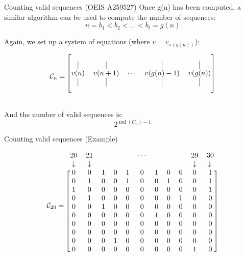 \documentclass{beamer}
\begin{document}
\begin{frame}{Counting valid sequences (OEIS A259527)}
  Once g(n) has been computed, a similar algorithm can be used to compute the
  number of sequences: \[
    n = b_1 < b_2 < \hdots < b_t = g(n)
  \]

  Again, we set up a system of equations (where $v = v_{\pi(g(n))}$): \[
    \mathcal{C}_n =
    \begin{blockarray}{ccccc}
      \begin{block}{[ccccc]}
        & & & & \\
        \vrule & \vrule   &        & \vrule      & \vrule \\
        v(n)   & v(n + 1) & \cdots & v(g(n) - 1) & v(g(n)) \\
        \vrule & \vrule   &        & \vrule      & \vrule \\
        & & & & \\
      \end{block}
    \end{blockarray}
  \]

    And the number of valid sequences is: \[ 2^{\operatorname{nul}(C_n) - 1} \]
\end{frame}

\begin{frame}{Counting valid sequences (Example)}

    \[
      \mathcal{C}_{20} =
      \begin{blockarray}{ccccccccccc}
    20         & 21         & & & & \cdots & & & & 29         & 30         \\
    \downarrow & \downarrow & & & &        & & & & \downarrow & \downarrow \\
      \begin{block}{[ccccccccccc]}
        0 & 0 & 1 & 0 & 1 & 0 & 1 & 0 & 0 & 0 & 1 \\
        0 & 1 & 0 & 0 & 1 & 0 & 0 & 1 & 0 & 0 & 1 \\
        1 & 0 & 0 & 0 & 0 & 0 & 0 & 0 & 0 & 0 & 1 \\
        0 & 1 & 0 & 0 & 0 & 0 & 0 & 0 & 1 & 0 & 0 \\
        0 & 0 & 1 & 0 & 0 & 0 & 0 & 0 & 0 & 0 & 0 \\
        0 & 0 & 0 & 0 & 0 & 0 & 1 & 0 & 0 & 0 & 0 \\
        0 & 0 & 0 & 0 & 0 & 0 & 0 & 0 & 0 & 0 & 0 \\
        0 & 0 & 0 & 0 & 0 & 0 & 0 & 0 & 0 & 0 & 0 \\
        0 & 0 & 0 & 1 & 0 & 0 & 0 & 0 & 0 & 0 & 0 \\
        0 & 0 & 0 & 0 & 0 & 0 & 0 & 0 & 0 & 1 & 0 \\
      \end{block}
      \end{blockarray}
    \]

\end{frame}
\end{document}
